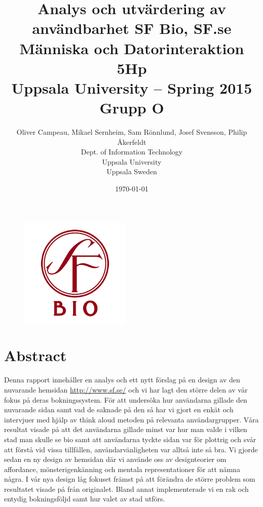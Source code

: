 \documentclass[swedish,a4paper,11pt]{article}
\begin{document}
\begin{titlepage}
\title{\textbf{Analys och utvärdering av användbarhet 
SF Bio, SF.se \\
    Människa och Datorinteraktion 5Hp \\ Uppsala University -- Spring 2015 \\
    Grupp O
      }}

\author{
Oliver Campeau, Mikael Sernheim, Sam Rönnlund, Josef Svensson, Philip Åkerfeldt \\
\textup{Dept. of Information Technology}\\
\textup{Uppsala University}\\
\textup{Uppsala Sweden}\\
}
\date{\today}

\end{titlepage}

\maketitle

\begin{figure}[hb]
\centering
\includegraphics[scale=1]{SFBioLogo.png} 
\end{figure}

\newpage

\section{Abstract}
Denna rapport innehåller en analys och ett nytt förslag på en design av den nuvarande hemsidan \url{http://www.sf.se/} och vi har lagt den större delen av vår fokus på deras bokningssystem. För att undersöka hur användarna gillade den nuvarande sidan samt vad de saknade på den så har vi gjort en enkät och intervjuer med hjälp av think aloud metoden på relevanta användargrupper. Våra resultat visade på att det användarna gillade minst var hur man valde i vilken stad man skulle se bio samt att användarna tyckte sidan var för plottrig och svår att förstå vid vissa tillfällen, användarvänligheten var alltså inte så bra. Vi gjorde sedan en ny design av hemsidan där vi använde oss av designteorier om affordance, mönsterigenkänning och mentala representationer för att nämna några. I vår nya design låg fokuset främst på att förändra de större problem som resultatet visade på från originalet. Bland annat implementerade vi en rak och entydig bokningsföljd samt hur valet av stad utförs.
\end{document}
